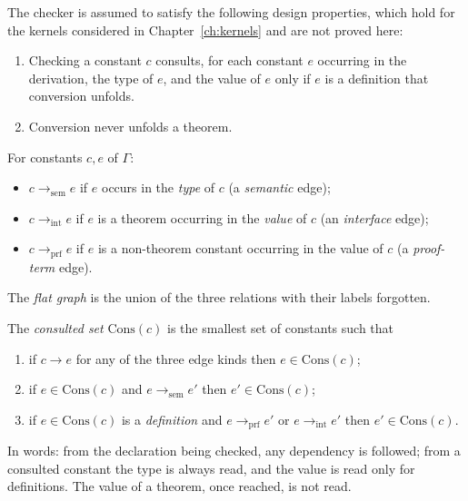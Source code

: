 \begin{convention}
\label{conv:kernel}
The checker is assumed to satisfy the following design properties, which hold for the kernels considered in Chapter~\ref{ch:kernels} and are not proved here:
\begin{enumerate}[label=(K\arabic*),nosep]
\item Checking a constant $c$ consults, for each constant $e$ occurring in the derivation, the type of $e$, and the value of $e$ only if $e$ is a definition that conversion unfolds.
\item Conversion never unfolds a theorem.
\end{enumerate}
\end{convention}

\begin{definition}
\label{def:typed-edges}
For constants $c,e$ of $\Gamma$:
\begin{itemize}[nosep]
\item $c\to_{\mathrm{sem}}e$ if $e$ occurs in the \emph{type} of $c$ (a \emph{semantic} edge);
\item $c\to_{\mathrm{int}}e$ if $e$ is a theorem occurring in the \emph{value} of $c$ (an \emph{interface} edge);
\item $c\to_{\mathrm{prf}}e$ if $e$ is a non-theorem constant occurring in the value of $c$ (a \emph{proof-term} edge).
\end{itemize}
The \emph{flat graph} is the union of the three relations with their labels forgotten.
\end{definition}

\begin{definition}
\label{def:consulted}
The \emph{consulted set} $\mathrm{Cons}(c)$ is the smallest set of constants such that
\begin{enumerate}[label=(\alph*),nosep]
\item if $c\to e$ for any of the three edge kinds then $e\in\mathrm{Cons}(c)$;
\item if $e\in\mathrm{Cons}(c)$ and $e\to_{\mathrm{sem}}e'$ then $e'\in\mathrm{Cons}(c)$;
\item if $e\in\mathrm{Cons}(c)$ is a \emph{definition} and $e\to_{\mathrm{prf}}e'$ or $e\to_{\mathrm{int}}e'$ then $e'\in\mathrm{Cons}(c)$.
\end{enumerate}
\end{definition}

In words: from the declaration being checked, any dependency is followed; from a consulted constant the type is always read, and the value is read only for definitions. The value of a theorem, once reached, is not read.

